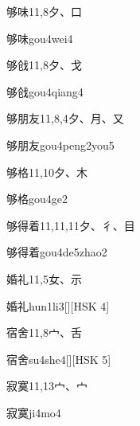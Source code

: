 \begin{entry}{够味}{11,8}{⼣、⼝}
  \begin{phonetics}{够味}{gou4wei4}
  \end{phonetics}
\end{entry}

\begin{entry}{够戗}{11,8}{⼣、⼽}
  \begin{phonetics}{够戗}{gou4qiang4}
  \end{phonetics}
\end{entry}

\begin{entry}{够朋友}{11,8,4}{⼣、⽉、⼜}
  \begin{phonetics}{够朋友}{gou4peng2you5}
  \end{phonetics}
\end{entry}

\begin{entry}{够格}{11,10}{⼣、⽊}
  \begin{phonetics}{够格}{gou4ge2}
  \end{phonetics}
\end{entry}

\begin{entry}{够得着}{11,11,11}{⼣、⼻、⽬}
  \begin{phonetics}{够得着}{gou4de5zhao2}
  \end{phonetics}
\end{entry}

\begin{entry}{婚礼}{11,5}{⼥、⽰}
  \begin{phonetics}{婚礼}{hun1li3}[][HSK 4]
  \end{phonetics}
\end{entry}

\begin{entry}{宿舍}{11,8}{⼧、⾆}
  \begin{phonetics}{宿舍}{su4she4}[][HSK 5]
  \end{phonetics}
\end{entry}

\begin{entry}{寂寞}{11,13}{⼧、⼧}
  \begin{phonetics}{寂寞}{ji4mo4}
  \end{phonetics}
\end{entry}

